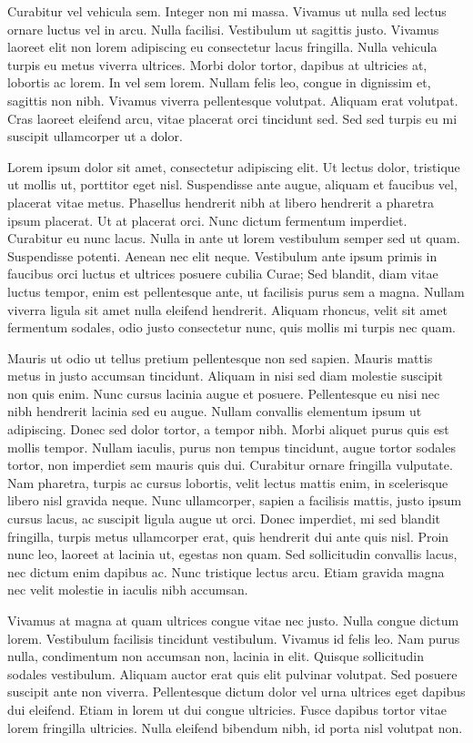 Curabitur vel vehicula sem.
Integer non mi massa.
Vivamus ut nulla sed lectus ornare luctus vel in arcu.
Nulla facilisi.
Vestibulum ut sagittis justo.
Vivamus laoreet elit non lorem adipiscing eu consectetur lacus fringilla.
Nulla vehicula turpis eu metus viverra ultrices.
Morbi dolor tortor, dapibus at ultricies at, lobortis ac lorem.
In vel sem lorem.
Nullam felis leo, congue in dignissim et, sagittis non nibh.
Vivamus viverra pellentesque volutpat.
Aliquam erat volutpat.
Cras laoreet eleifend arcu, vitae placerat orci tincidunt sed.
Sed sed turpis eu mi suscipit ullamcorper ut a dolor.

Lorem ipsum dolor sit amet, consectetur adipiscing elit.
Ut lectus dolor, tristique ut mollis ut, porttitor eget nisl.
Suspendisse ante augue, aliquam et faucibus vel, placerat vitae metus.
Phasellus hendrerit nibh at libero hendrerit a pharetra ipsum placerat.
Ut at placerat orci.
Nunc dictum fermentum imperdiet.
Curabitur eu nunc lacus.
Nulla in ante ut lorem vestibulum semper sed ut quam.
Suspendisse potenti.
Aenean nec elit neque.
Vestibulum ante ipsum primis in faucibus orci luctus et ultrices posuere cubilia Curae; Sed blandit, diam vitae luctus tempor, enim est pellentesque ante, ut facilisis purus sem a magna.
Nullam viverra ligula sit amet nulla eleifend hendrerit.
Aliquam rhoncus, velit sit amet fermentum sodales, odio justo consectetur nunc, quis mollis mi turpis nec quam.

Mauris ut odio ut tellus pretium pellentesque non sed sapien.
Mauris mattis metus in justo accumsan tincidunt.
Aliquam in nisi sed diam molestie suscipit non quis enim.
Nunc cursus lacinia augue et posuere.
Pellentesque eu nisi nec nibh hendrerit lacinia sed eu augue.
Nullam convallis elementum ipsum ut adipiscing.
Donec sed dolor tortor, a tempor nibh.
Morbi aliquet purus quis est mollis tempor.
Nullam iaculis, purus non tempus tincidunt, augue tortor sodales tortor, non imperdiet sem mauris quis dui.
Curabitur ornare fringilla vulputate.
Nam pharetra, turpis ac cursus lobortis, velit lectus mattis enim, in scelerisque libero nisl gravida neque.
Nunc ullamcorper, sapien a facilisis mattis, justo ipsum cursus lacus, ac suscipit ligula augue ut orci.
Donec imperdiet, mi sed blandit fringilla, turpis metus ullamcorper erat, quis hendrerit dui ante quis nisl.
Proin nunc leo, laoreet at lacinia ut, egestas non quam.
Sed sollicitudin convallis lacus, nec dictum enim dapibus ac.
Nunc tristique lectus arcu.
Etiam gravida magna nec velit molestie in iaculis nibh accumsan.

Vivamus at magna at quam ultrices congue vitae nec justo.
Nulla congue dictum lorem.
Vestibulum facilisis tincidunt vestibulum.
Vivamus id felis leo.
Nam purus nulla, condimentum non accumsan non, lacinia in elit.
Quisque sollicitudin sodales vestibulum.
Aliquam auctor erat quis elit pulvinar volutpat.
Sed posuere suscipit ante non viverra.
Pellentesque dictum dolor vel urna ultrices eget dapibus dui eleifend.
Etiam in lorem ut dui congue ultricies.
Fusce dapibus tortor vitae lorem fringilla ultricies.
Nulla eleifend bibendum nibh, id porta nisl volutpat non.


